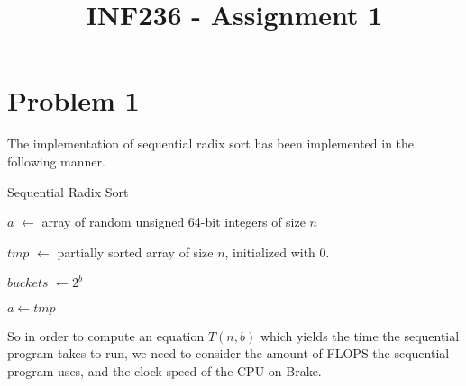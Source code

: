 \documentclass{article}
\title{INF236 - Assignment 1}
\begin{document}
\maketitle
\newpage
\tableofcontents
\newpage
    \section{Problem 1}

    The implementation of sequential radix sort has been implemented in the following manner.

    \begin{algorithm}[H]
        \caption{Sequential Radix Sort}
        \SetAlgoVlined
         \( a \) \( \leftarrow \) array of random unsigned 64-bit integers of size \( n \)

        \( tmp \) \( \leftarrow \) partially sorted array of size \( n \), initialized with 0.

        \( buckets \) \( \gets 2^{b} \)


        \( a  \leftarrow tmp\) 
    \end{algorithm} 

    So in order to compute an equation \( T\left( n,b \right) \) which yields the time the sequential program takes to run, we need to consider the amount of FLOPS the sequential program uses, and the clock speed of the CPU on Brake.
\end{document}
